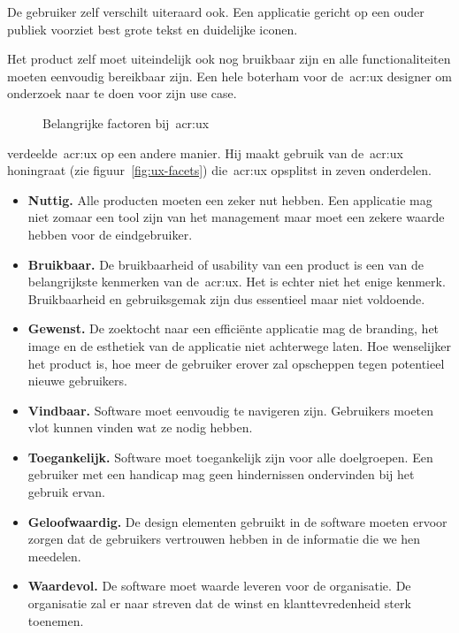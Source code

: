 De gebruiker zelf verschilt uiteraard ook. Een applicatie gericht op een ouder publiek voorziet best grote tekst en duidelijke iconen.

Het product zelf moet uiteindelijk ook nog bruikbaar zijn en alle functionaliteiten moeten eenvoudig bereikbaar zijn.
Een hele boterham voor de~\acrlong{acr:ux} designer om onderzoek naar te doen voor zijn use case.

\begin{figure}
    \centering
    \def\svgwidth{.8\columnwidth}
    
    \caption{Belangrijke factoren bij~\acrlong{acr:ux}}
    \label{fig:ux-factoren}
\end{figure}

\textcite{Morville2004} verdeelde~\acrlong{acr:ux} op een andere manier. Hij maakt gebruik van de~\acrlong{acr:ux} honingraat (zie figuur~\ref{fig:ux-facets}) die~\acrlong{acr:ux} opsplitst in zeven onderdelen.

\begin{itemize}
    \item \textbf{Nuttig.}
    Alle producten moeten een zeker nut hebben. Een applicatie mag niet zomaar een tool zijn van het management maar moet een zekere waarde hebben voor de eindgebruiker.
    \item \textbf{Bruikbaar.}
    De bruikbaarheid of usability van een product is een van de belangrijkste kenmerken van de~\acrlong{acr:ux}. Het is echter niet het enige kenmerk. Bruikbaarheid en gebruiksgemak zijn dus essentieel maar niet voldoende.
    \item \textbf{Gewenst.}
    De zoektocht naar een efficiënte applicatie mag de branding, het image en de esthetiek van de applicatie niet achterwege laten. Hoe wenselijker het product is, hoe meer de gebruiker erover zal opscheppen tegen potentieel nieuwe gebruikers.
    \item \textbf{Vindbaar.}
    Software moet eenvoudig te navigeren zijn. Gebruikers moeten vlot kunnen vinden wat ze nodig hebben.
    \item \textbf{Toegankelijk.}
    Software moet toegankelijk zijn voor alle doelgroepen. Een gebruiker met een handicap mag geen hindernissen ondervinden bij het gebruik ervan.
    \item \textbf{Geloofwaardig.}
    De design elementen gebruikt in de software moeten ervoor zorgen dat de gebruikers vertrouwen hebben in de informatie die we hen meedelen.
    \item \textbf{Waardevol.}
    De software moet waarde leveren voor de organisatie. De organisatie zal er naar streven dat de winst en klanttevredenheid sterk toenemen.
\end{itemize}

